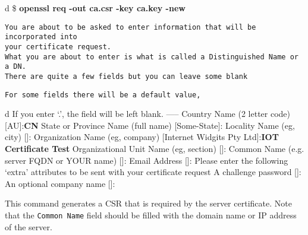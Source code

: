 \documentclass[a4paper,12pt]{book}
\begin{document}
\begin{codebloc}
\begin{tabular}{d}
\$ \textbf{openssl req -out ca.csr -key ca.key -new}
\begin{verbatim}
You are about to be asked to enter information that will be incorporated into
your certificate request.
What you are about to enter is what is called a Distinguished Name or a DN.
There are quite a few fields but you can leave some blank
\end{verbatim}
\verb|For some fields there will be a default value,|
\end{tabular}
\end{codebloc}

\begin{codebloc}
\begin{tabular}{d}
If you enter ‘.’, the field will be left blank.\newline
-----\newline
Country Name (2 letter code) [AU]:\textbf{CN}\newline
State or Province Name (full name) [Some-State]:\newline
Locality Name (eg, city) []:\newline
Organization Name (eg, company) [Internet Widgits Pty Ltd]:\textbf{IOT Certificate Test}\newline
Organizational Unit Name (eg, section) []:\newline
Common Name (e.g. server FQDN or YOUR name) []:\newline
Email Address []:\newline
\vspace{10pt}
Please enter the following ‘extra’ attributes\newline
to be sent with your certificate request\newline
A challenge password []:\newline
An optional company name []:
\end{tabular}
\end{codebloc}

\vspace{6pt}
This command generates a CSR that is required by the server certificate. Note that the \verb|Common Name| field should be filled with the domain name or IP address of the server.
\end{document}
